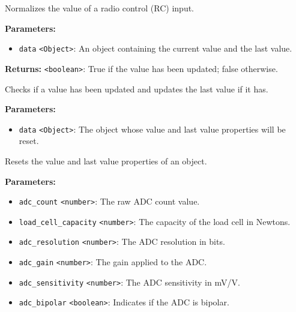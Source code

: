 \documentclass[12pt,a4paper]{article}
\begin{document}
\noindent Normalizes the value of a radio control (RC) input.

\vspace{5mm}
\noindent {}


\noindent \textbf{Parameters:}
\begin{itemize}
  \item \texttt{data} \texttt{<Object>}: An object containing the current value and the last value.
\end{itemize}

\noindent \textbf{Returns:} \texttt{<boolean>}: True if the value has been updated; false otherwise.

\noindent Checks if a value has been updated and updates the last value if it has.

\vspace{5mm}
\noindent {}


\noindent \textbf{Parameters:}
\begin{itemize}
  \item \texttt{data} \texttt{<Object>}: The object whose value and last value properties will be reset.
\end{itemize}

\noindent Resets the value and last value properties of an object.

\vspace{5mm}
\noindent {}


\noindent \textbf{Parameters:}
\begin{itemize}
  \item \texttt{adc\_count} \texttt{<number>}: The raw ADC count value.
  \item \texttt{load\_cell\_capacity} \texttt{<number>}: The capacity of the load cell in Newtons.
  \item \texttt{adc\_resolution} \texttt{<number>}: The ADC resolution in bits.
  \item \texttt{adc\_gain} \texttt{<number>}: The gain applied to the ADC.
  \item \texttt{adc\_sensitivity} \texttt{<number>}: The ADC sensitivity in mV/V.
  \item \texttt{adc\_bipolar} \texttt{<boolean>}: Indicates if the ADC is bipolar.
\end{itemize}
\end{document}
